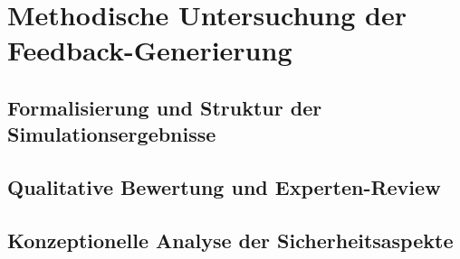 \chapter{Methodische Untersuchung der Feedback-Generierung}
\label{cap:Untersuchung}

\section{Formalisierung und Struktur der Simulationsergebnisse}
\label{sec:Formalisierung_Ergebnisse}

\section{Qualitative Bewertung und Experten-Review}
\label{sec:Qualitative_Bewertung}

\section{Konzeptionelle Analyse der Sicherheitsaspekte}
\label{sec:Analyse_Sicherheit}
